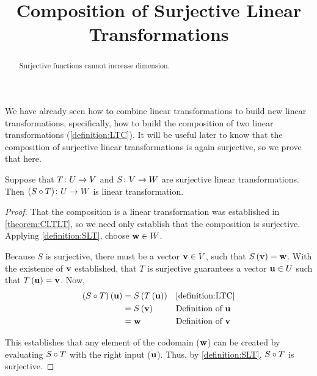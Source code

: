 \documentclass{ximera}
\title{Composition of Surjective Linear Transformations}
\begin{document}
\begin{abstract}
  Surjective functions cannot increase dimension.
\end{abstract}
\maketitle

We have already seen how to combine linear transformations to build
new linear transformations, specifically, how to build the composition
of two linear transformations (\ref{definition:LTC}).  It will be
useful later to know that the composition of surjective linear
transformations is again surjective, so we prove that here.

\begin{theorem}
\label{theorem:CSLTS}

Suppose that $T\colon U\rightarrow V$ and $S\colon V\rightarrow W$ are surjective linear transformations.  Then $({S}\circ{T})\colon U\rightarrow W$ is  linear transformation.


\begin{proof}
That the composition is a linear transformation was established in \ref{theorem:CLTLT}, so we need only establish that the composition is surjective.  Applying \ref{definition:SLT}, choose $\mathbf{w}\in W$.



Because $S$ is surjective, there must be a vector $\mathbf{v}\in V$, such that $S\left(\mathbf{v}\right)=\mathbf{w}$.  With the existence of $\mathbf{v}$ established, that $T$ is surjective guarantees a vector $\mathbf{u}\in U$ such that $T\left(\mathbf{u}\right)=\mathbf{v}$.  Now,
\begin{align*}
\left({S}\circ{T}\right)\left(\mathbf{u}\right)&=S\left(T\left(\mathbf{u}\right)\right)&&\ref{definition:LTC}\\
&=S\left(\mathbf{v}\right)&&\text{Definition of $\mathbf{u}$}\\
&=\mathbf{w}&&\text{Definition of $\mathbf{v}$}
\end{align*}




This establishes that any element of the codomain ($\mathbf{w}$) can be created by evaluating ${S}\circ{T}$ with the right input ($\mathbf{u}$).  Thus, by \ref{definition:SLT}, ${S}\circ{T}$ is surjective.



\end{proof}
\end{theorem}
\end{document}

